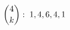 \documentclass[preview]{standalone}
\begin{document}
\begin{align*}
\special{dvisvgm:raw <g id='unique000'>}\binom{4}{k}: \; 1, 4, 6, 4, 1\special{dvisvgm:raw </g>}
\end{align*}
\end{document}
